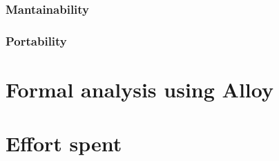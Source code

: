 \documentclass[12pt]{article}
\begin{document}
    \subsubsection{Mantainability}
    \subsubsection{Portability}

\clearpage
\section{Formal analysis using Alloy}
\label{sec:alloy}

  

\clearpage
\section{Effort spent}
\label{sec:effort}
\end{document}
